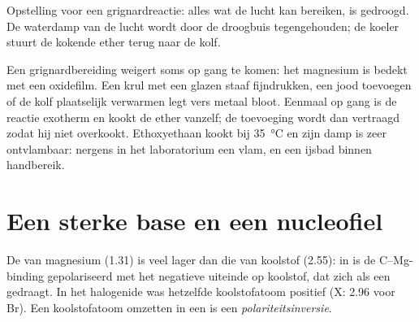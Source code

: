 \begin{omfigure}

{\small Opstelling voor een grignardreactie: alles wat de lucht kan
bereiken, is gedroogd. De waterdamp van de lucht wordt door de droogbuis
tegengehouden; de koeler stuurt de kokende ether terug naar de kolf.}
\end{omfigure}

\begin{inthelab}
Een grignardbereiding weigert soms op gang te komen: het magnesium is
bedekt met een oxidefilm. Een krul met een glazen staaf fijndrukken, een
 jood toevoegen of de kolf plaatselijk verwarmen legt vers metaal
bloot. Eenmaal op gang is de reactie exotherm en kookt de ether vanzelf;
de toevoeging wordt dan vertraagd zodat hij niet overkookt. Ethoxyethaan
kookt bij \qty{35}{\celsius} en zijn damp is zeer ontvlambaar: nergens in
het laboratorium een vlam, en een ijsbad binnen handbereik.
\end{inthelab}


\section{Een sterke base en een nucleofiel}

\begin{definition}[Polariteitsinversie]\label{def:b1:organomagnesium:umpolung}
De  van magnesium (1.31) is veel lager dan die van
koolstof (2.55): in  is de C--Mg-binding gepolariseerd met het
negatieve uiteinde op koolstof, dat zich als een  gedraagt. In
het halogenide  was hetzelfde koolstofatoom positief (X: 2.96 voor
Br). Een  koolstofatoom omzetten in een  is een
\emph{polariteitsinversie}.
\end{definition}


